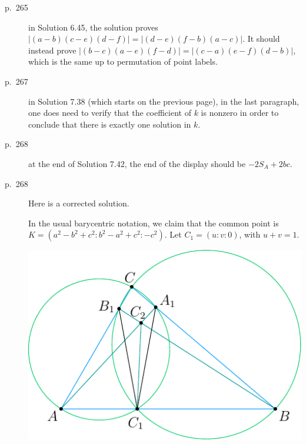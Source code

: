 \documentclass[11pt]{scrartcl}
\begin{document}
\begin{description}
\item[p.\  265] in Solution 6.45, the solution proves $|(a-b)(c-e)(d-f)|=|(d-e)(f-b)(a-c)|$.
  It should instead prove $|(b-c)(a-e)(f-d)|=|(c-a)(e-f)(d-b)|$,
  which is the same up to permutation of point labels.
\item[p.\ 267] in Solution 7.38 (which starts on the previous page),
  in the last paragraph, one does need to verify that the coefficient of $k$ is nonzero
  in order to conclude that there is exactly one solution in $k$.
\item[p.\  268] at the end of Solution 7.42, the end of the display should be $-2S_A+2bc$.
\item[p.\  268] 
  Here is a corrected solution.

  In the usual barycentric notation,
  we claim that the common point is $K = \left( a^2-b^2+c^2 : b^2-a^2+c^2 : -c^2 \right)$.
  Let $C_1 = (u:v:0)$, with $u+v=1$.
  \begin{center}
    \includegraphics{sharygin-figure.pdf}
  \end{center}


\end{description}
\end{document}
